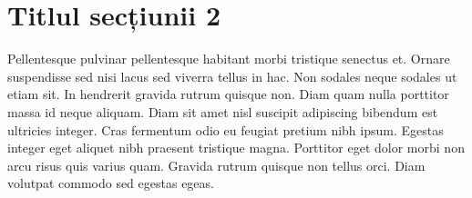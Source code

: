 \section{Titlul secțiunii 2}

Pellentesque pulvinar pellentesque habitant morbi tristique senectus et. Ornare suspendisse sed nisi lacus sed viverra tellus in hac. Non sodales neque sodales ut etiam sit. In hendrerit gravida rutrum quisque non. Diam quam nulla porttitor massa id neque aliquam. Diam sit amet nisl suscipit adipiscing bibendum est ultricies integer. Cras fermentum odio eu feugiat pretium nibh ipsum. Egestas integer eget aliquet nibh praesent tristique magna. Porttitor eget dolor morbi non arcu risus quis varius quam. Gravida rutrum quisque non tellus orci. Diam volutpat commodo sed egestas egeas.
